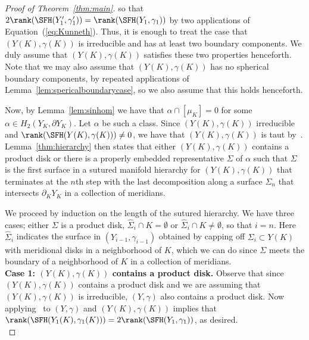 \documentclass{amsart}
\theoremstyle{definition}
\theoremstyle{remark}
\numberwithin{equation}{section}
\begin{document}
\begin{proof}[Proof of Theorem~\ref{thm:main}]
\noindent so that $2\rank(\SFH(Y_1',\gamma_1'))=\rank(\SFH(Y_1,\gamma_1))$ by two applications of Equation~(\ref{eq:Kunneth}). Thus, it is enough to treat the case that $(Y(K),\gamma(K))$ is irreducible and has at least two boundary components. We duly assume that $(Y(K),\gamma(K))$ satisfies these two properties henceforth. Note that we may also assume that $(Y(K),\gamma(K))$ has no spherical boundary components, by repeated applications of Lemma~\ref{lem:spericalboundarycase}, so we also assume that this holds henceforth. 

Now, by Lemma~\ref{lem:sinhom} we have that $\alpha\cap[\mu_K]=0$ for some $\alpha\in H_2(Y_K,\partial Y_K)$. Let $\alpha$ be such a class. Since $(Y(K),\gamma(K))$ irreducible and $\rank(\SFH(Y(K),\gamma(K)))\neq0$, we have that $(Y(K),\gamma(K))$ is taut by~\cite[Proposition 9.18]{juhasz2006holomorphic}. Lemma~\ref{thm:hierarchy} then states that either $(Y(K),\gamma(K))$ contains a product disk or there is a properly embedded representative $\Sigma$ of $\alpha$ such that $\Sigma$ is the first surface in a sutured manifold hierarchy for $(Y(K),\gamma(K))$ that terminates at the $n$th step with the last decomposition along a surface $\Sigma_n$ that intersects $\partial_KY_K$ in a collection of meridians.
 
We proceed by induction on the length of the sutured hierarchy. We have three cases; either $\Sigma$ is a product disk, $\widehat{\Sigma}_i\cap K=\emptyset$ or $\widehat{\Sigma}_i\cap K\neq\emptyset$, so that $i=n$. Here $\widehat{\Sigma}_i$ indicates the surface in $(Y_{i-1},\gamma_{i-1})$ obtained by capping off $\Sigma_i\subset Y(K)$ with meridional disks in a neighborhood of $K$, which we can do since $\Sigma$ meets the boundary of a neighborhood of $K$ in a collection of meridians.\\


\noindent\textbf{Case 1: $(Y(K),\gamma(K))$ contains a product disk.}  Observe that since $(Y(K),\gamma(K))$ contains a product disk and we are assuming that $(Y(K),\gamma(K))$ is irreducible, $(Y,\gamma)$ also contains a product disk. Now applying~\cite[Lemma 9.13]{juhasz2006holomorphic} to $(Y,\gamma)$ and $(Y(K),\gamma(K))$ implies that $\rank(\SFH(Y_1(K),\gamma_1(K)))=2\rank(\SFH(Y_1,\gamma_1))$, as desired.\\


\end{proof}
\end{document}

